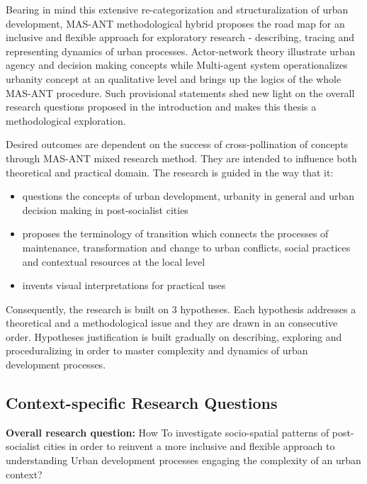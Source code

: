 \documentclass[11pt]{report}
\begin{document}
Bearing in mind this extensive re-categorization and structuralization of urban development, MAS-ANT methodological hybrid proposes the road map for an inclusive and flexible approach for exploratory research - describing, tracing and representing dynamics of urban processes. Actor-network theory illustrate urban agency and decision making concepts while Multi-agent system operationalizes urbanity concept at an qualitative level and brings up the logics of the whole MAS-ANT procedure. Such provisional statements shed new light on the overall research questions proposed in the introduction and makes this thesis a methodological exploration.

Desired outcomes are dependent on the success of cross-pollination of concepts through MAS-ANT mixed research method. They are intended to influence both theoretical and practical domain. The research is guided in the way that it:
\begin{itemize}
\item questions the concepts of urban development, urbanity in general and urban decision making in post-socialist cities
\item proposes the terminology of transition which connects the processes of maintenance, transformation and change to urban conflicts, social practices and contextual resources at the local level
\item invents visual interpretations for practical uses
\end{itemize}

Consequently, the research is built on 3 hypotheses. Each hypothesis addresses a theoretical and a methodological issue and they are drawn in an consecutive order. Hypotheses justification is built gradually on describing, exploring and proceduralizing in order to master complexity and dynamics of urban development processes. 

\subsection{Context-specific Research Questions}

\textbf{Overall research question:} How To investigate socio-spatial patterns of post-socialist cities in order to reinvent a more inclusive and flexible approach to understanding Urban development processes engaging the complexity of an urban context? 
\end{document}
